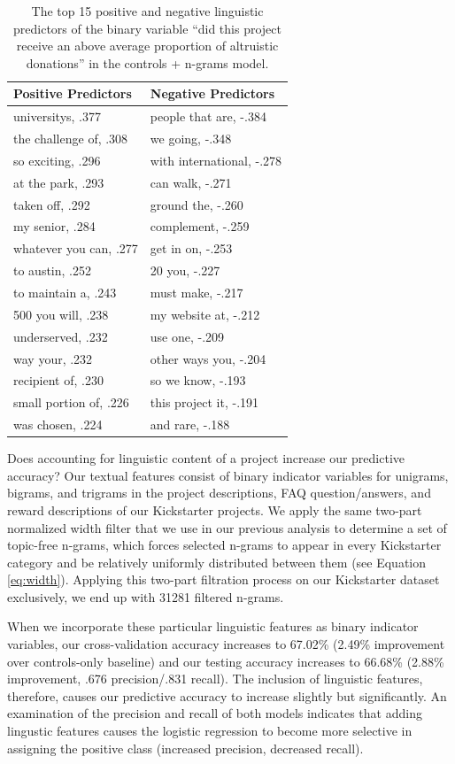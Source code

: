 \documentclass[letterpaper]{article}
\begin{document}
\begin{table}[t]
\centering
\begin{tabular}{|l|l|}
\hline
Positive Predictors & Negative Predictors \\
\hline
universitys, .377 & people that are, -.384 \\
the challenge of, .308 & we going, -.348\\
so exciting, .296 & with international, -.278\\
at the park, .293 & can walk, -.271\\
taken off, .292 & ground the, -.260\\
my senior, .284 & complement, -.259\\
whatever you can, .277 & get in on, -.253\\
to austin, .252 & 20 you, -.227\\
to maintain a, .243 & must make, -.217\\
500 you will, .238 & my website at, -.212\\
underserved, .232 & use one, -.209 \\
way your, .232 & other ways you, -.204\\
recipient of, .230 & so we know, -.193\\
small portion of, .226 & this project it, -.191\\
was chosen, .224 & and rare, -.188\\
\hline
\end{tabular}
\caption{The top 15 positive and negative linguistic predictors of the binary variable ``did this project receive an above average proportion of altruistic donations'' in the controls + n-grams model.}
\label{tab:regression}
\end{table}

Does accounting for linguistic content of a project increase our predictive accuracy? Our textual features consist of binary indicator variables for unigrams, bigrams, and trigrams in the project descriptions, FAQ question/answers, and reward descriptions of our Kickstarter projects. We apply the same two-part normalized width filter that we use in our previous analysis to determine a set of topic-free n-grams, which forces selected n-grams to appear in every Kickstarter category and be relatively uniformly distributed between them (see Equation \ref{eq:width}). Applying this two-part filtration process on our Kickstarter dataset exclusively, we end up with 31281 filtered n-grams.

When we incorporate these particular linguistic features as binary indicator variables, our cross-validation accuracy increases to 67.02\% (2.49\% improvement over controls-only baseline) and our testing accuracy increases to 66.68\% (2.88\% improvement, .676 precision/.831 recall). The inclusion of linguistic features, therefore, causes our predictive accuracy to increase slightly but significantly. An examination of the precision and recall of both models indicates that adding lingustic features causes the logistic regression to become more selective in assigning the positive class (increased precision, decreased recall).
\end{document}
